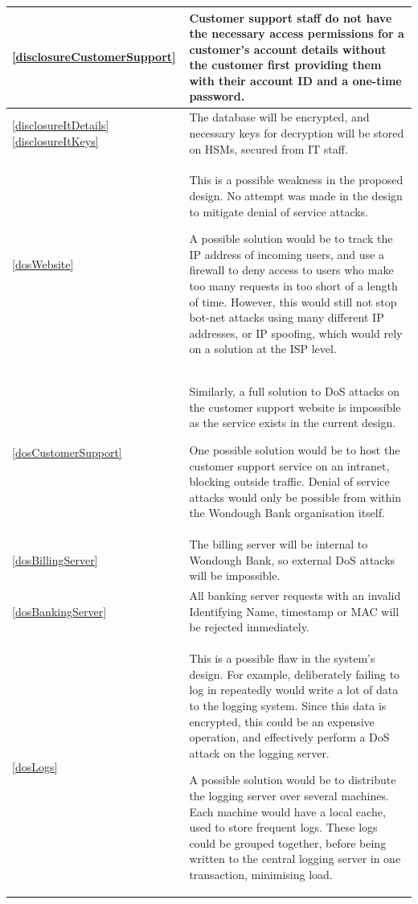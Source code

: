 \begin{longtable}{|| p{} | p{} ||}
    \\ \hline \ref{disclosureCustomerSupport} &
        Customer support staff do not have the necessary access permissions for a customer's account details without the customer first providing them with their account ID and a one-time password.
    \\ \hline \ref{disclosureItDetails} \ref{disclosureItKeys} &
        The database will be encrypted, and necessary keys for decryption will be stored on HSMs, secured from IT staff.
    \\ \hline \textcolor{red}{\ref{dosWebsite}} &
        This is a possible weakness in the proposed design. No attempt was made in the design to mitigate denial of service attacks.

        A possible solution would be to track the IP address of incoming users, and use a firewall to deny access to users who make too many requests in too short of a length of time. However, this would still not stop bot-net attacks using many different IP addresses, or IP spoofing, which would rely on a solution at the ISP level.
    \\ \hline \textcolor{red}{\ref{dosCustomerSupport}} &
        Similarly, a full solution to DoS attacks on the customer support website is impossible as the service exists in the current design.

        One possible solution would be to host the customer support service on an intranet, blocking outside traffic. Denial of service attacks would only be possible from within the Wondough Bank organisation itself.
    \\ \hline \ref{dosBillingServer} &
        The billing server will be internal to Wondough Bank, so external DoS attacks will be impossible. 
    \\ \hline \ref{dosBankingServer} &
        All banking server requests with an invalid Identifying Name, timestamp or MAC will be rejected immediately.
    \\ \hline \textcolor{red}{\ref{dosLogs}} &
        This is a possible flaw in the system's design. For example, deliberately failing to log in repeatedly would write a lot of data to the logging system. Since this data is encrypted, this could be an expensive operation, and effectively perform a DoS attack on the logging server.

        A possible solution would be to distribute the logging server over several machines. Each machine would have a local cache, used to store frequent logs. These logs could be grouped together, before being written to the central logging server in one transaction, minimising load.


\end{longtable}
